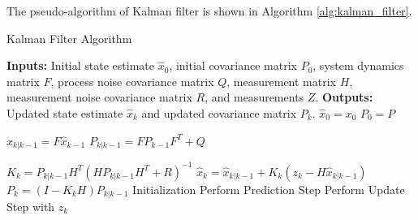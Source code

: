 The pseudo-algorithm of Kalman filter is shown in Algorithm \ref{alg:kalman_filter}.
\begin{algorithm}
    \caption{Kalman Filter Algorithm}
    \begin{algorithmic}[1]
        \State \textbf{Inputs:} Initial state estimate $\hat{x}_0$, initial covariance matrix $P_0$, system
        dynamics matrix $F$, process noise covariance matrix $Q$, measurement matrix $H$, measurement noise
        covariance matrix $R$, and measurements $Z$.
        \State \textbf{Outputs:} Updated state estimate $\hat{x}_k$ and updated covariance matrix $P_k$.
        \State
            \State $\hat{x}_0 = x_0$  
            \State $P_0 = P$ 
        \EndProcedure

        \State
            \State $\hat{x}_{k|k-1} = F \hat{x}_{k-1} $ 
            \State $P_{k|k-1} = F P_{k-1} F^T + Q$ 
        \EndProcedure

        \State
            \State $K_k = P_{k|k-1} H^T (H P_{k|k-1} H^T + R)^{-1}$ 
            \State $\hat{x}_k = \hat{x}_{k|k-1} + K_k(z_k - H \hat{x}_{k|k-1})$ 
            \State $P_k = (I - K_k H) P_{k|k-1}$ 
        \EndProcedure
        \State
            \State Initialization
                \State Perform Prediction Step
                \State Perform Update Step with $z_k$
            \EndFor
        \EndProcedure

    \end{algorithmic}
    \label{alg:kalman_filter}
\end{algorithm}